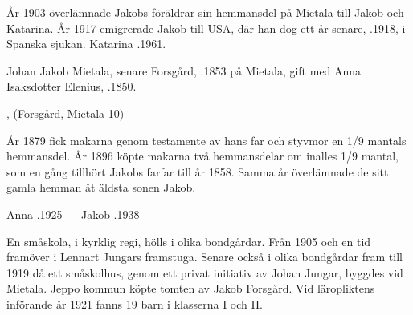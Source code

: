 År 1903 överlämnade Jakobs föräldrar sin hemmansdel på Mietala till Jakob och Katarina. År 1917 emigrerade Jakob till USA, där han dog ett år senare, .1918, i Spanska sjukan. Katarina .1961.


%
Johan Jakob Mietala, senare Forsgård, .1853 på Mietala, gift med Anna Isaksdotter Elenius, .1850.
\begin{jhchildren}
  \item {}
  \item {}
  \item {}
  \item {}
  \item {}
  \item {}
  \item {}, (Forsgård, Mietala 10)
\end{jhchildren}

År 1879 fick makarna genom testamente av hans far och styvmor en 1/9 mantals hemmansdel. År 1896 köpte makarna två hemmansdelar om inalles 1/9 mantal, som en gång tillhört Jakobs farfar till år 1858. Samma år överlämnade de sitt gamla hemman åt äldsta sonen Jakob.

Anna .1925  ---  Jakob .1938



%



%
En småskola, i kyrklig regi, hölls i olika bondgårdar. Från 1905 och en tid framöver i Lennart Jungars framstuga. Senare också i olika bondgårdar fram till 1919 då ett småskolhus, genom ett privat initiativ av Johan Jungar, byggdes vid Mietala. Jeppo kommun köpte tomten av Jakob Forsgård. Vid läropliktens införande år 1921 fanns 19 barn i klasserna I och II.


